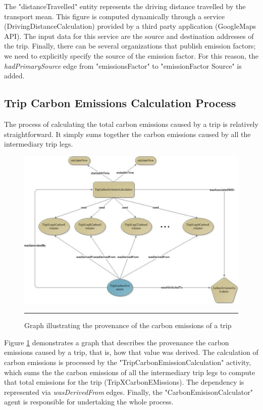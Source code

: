 The "distanceTravelled" entity represents the driving distance travelled by the transport mean. This figure is computed dynamically through a service (DrivingDistanceCalculation) provided by a third party application (GoogleMaps API). The input data for this service are the source and destination addresses of the trip. Finally, there can be several organizations that publish emission factors; we need to explicitly specify the source of the emission factor. For this reason, the \emph{hadPrimarySource} edge from "emissionsFactor" to "emissionFactor Source" is added.


\subsection{Trip Carbon Emissions Calculation Process}

The process of calculating the total carbon emissions caused by a trip is relatively straightforward. It simply sums together the carbon emissions caused by all the intermediary trip legs.

\begin{figure}[htbp]
	\centering
		\includegraphics[scale=0.60]{./Figures/chapter3/figure3.pdf}
		\rule{35em}{0.5pt}
	\caption[ Graph illustrating the provenance of the carbon emissions of a trip]{ Graph illustrating the provenance of the carbon emissions of a trip}
	\label{fig:provTripCo2Graph}
\end{figure}

Figure \ref{fig:provTripCo2Graph} demonstrates a graph that describes the provenance the carbon emissions caused by a trip, that is, how that value was derived. The calculation of carbon emissions is processed by the "TripCarbonEmissionCalculation" activity, which sums the the carbon emissions of all the intermediary trip legs to compute that total emissions for the trip (TripXCarbonEMissions).  The dependency is represented via \emph{wasDerivedFrom} edges. Finally, the "CarbonEmisisonCalculator" agent is responsible for undertaking the whole process.

